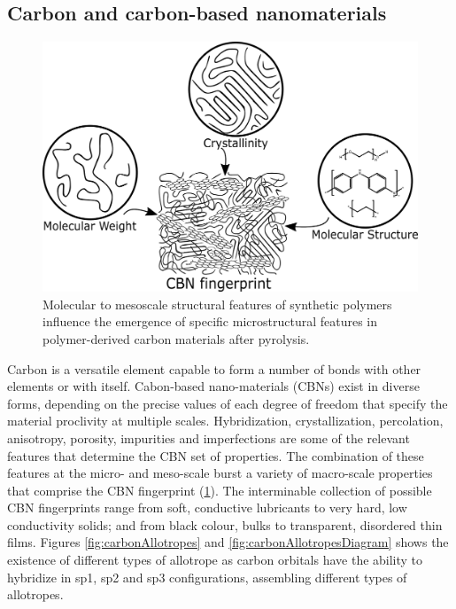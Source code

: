 \subsection{Carbon and carbon-based nanomaterials}

\begin{figure}[th]
\centering
\includegraphics[scale=0.40]{./Figures/CBNfingerprint.png}
\decoRule
\caption[Fingerprint of Carbon-based Nano-materials]{Molecular to mesoscale structural features of synthetic polymers influence the emergence of specific microstructural features in polymer-derived carbon materials after pyrolysis.}
\label{fig:CBNfingerprint}
\end{figure}

Carbon is a versatile element capable to form a number of bonds with other elements or with itself. Cabon-based nano-materials (CBNs) exist in diverse forms, depending on the precise values of each degree of freedom that specify the material proclivity at multiple scales. Hybridization, crystallization, percolation, anisotropy, porosity, impurities and imperfections are some of the relevant features that determine the CBN set of properties. The combination of these features at the micro- and meso-scale burst a variety of macro-scale properties that comprise the CBN fingerprint (\ref{fig:CBNfingerprint}). The interminable collection of possible CBN fingerprints range from soft, conductive lubricants to very hard, low conductivity solids; and from black colour, bulks to transparent, disordered thin films. \cite{McCreery2008} Figures \ref{fig:carbonAllotropes} and \ref{fig:carbonAllotropesDiagram} shows the existence of different types of allotrope as carbon orbitals have the ability to hybridize in sp1, sp2 and sp3 configurations, assembling different types of allotropes.

